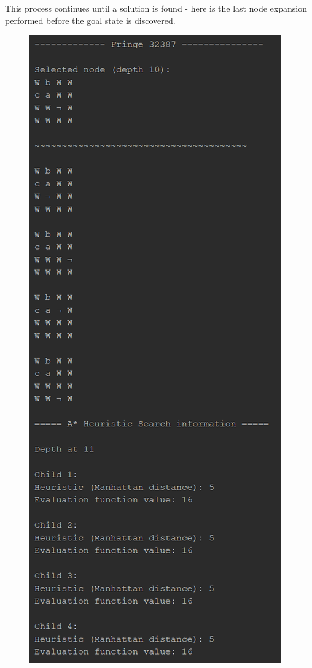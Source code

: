 \documentclass{article}
\begin{document}
	\newpage
	This process continues until a solution is found - here is the last node expansion performed before the goal state is discovered.
	\begin{figure}[h]
		\centering
		\includegraphics[height=0.75\textheight]{AStar-2-3.png}
	\end{figure}
\end{document}
